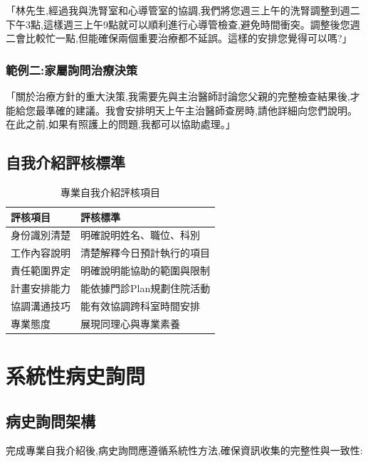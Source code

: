 \documentclass[12pt,a4paper]{article}
\begin{document}
\begin{tcolorbox}[
    colback=highlight_yellow,
    colframe=emergency_gray,
    title=\textbf{協調對話範例}
]
「林先生,經過我與洗腎室和心導管室的協調,我們將您週三上午的洗腎調整到週二下午3點,這樣週三上午9點就可以順利進行心導管檢查,避免時間衝突。調整後您週二會比較忙一點,但能確保兩個重要治療都不延誤。這樣的安排您覺得可以嗎?」
\end{tcolorbox}

\subsubsection{範例二:家屬詢問治療決策}
\begin{tcolorbox}[
    colback=highlight_yellow,
    colframe=emergency_gray,
    title=\textbf{適當的回應範例}
]
「關於治療方針的重大決策,我需要先與主治醫師討論您父親的完整檢查結果後,才能給您最準確的建議。我會安排明天上午主治醫師查房時,請他詳細向您們說明。在此之前,如果有照護上的問題,我都可以協助處理。」
\end{tcolorbox}

\subsection{自我介紹評核標準}
\begin{table}[h]
    \centering
    \caption{專業自我介紹評核項目}
    \begin{tabular}{p{4cm} p{10cm}}
        \toprule
        \textbf{評核項目} & \textbf{評核標準} \\
        \midrule
        身份識別清楚 & 明確說明姓名、職位、科別 \\
        工作內容說明 & 清楚解釋今日預計執行的項目 \\
        責任範圍界定 & 明確說明能協助的範圍與限制 \\
        計畫安排能力 & 能依據門診Plan規劃住院活動 \\
        協調溝通技巧 & 能有效協調跨科室時間安排 \\
        專業態度 & 展現同理心與專業素養 \\
        \bottomrule
    \end{tabular}
\end{table}

\section{系統性病史詢問}

\subsection{病史詢問架構}
完成專業自我介紹後,病史詢問應遵循系統性方法,確保資訊收集的完整性與一致性:
\end{document}
